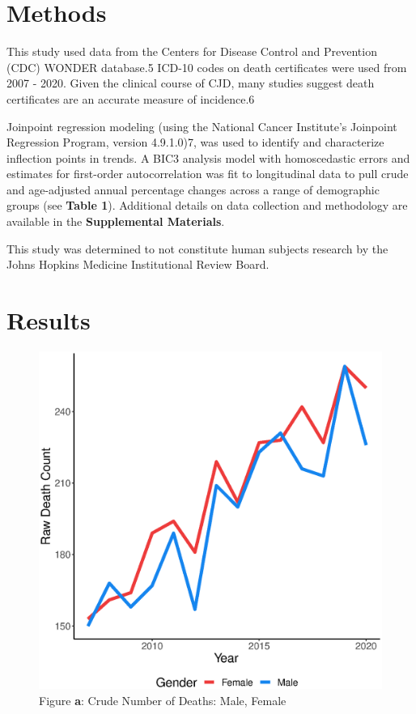 \documentclass[12pt]{article}
\begin{document}
\section*{Methods}

\par \bigskip
\noindent This study used data from the Centers for Disease Control and Prevention (CDC) WONDER database.5 ICD-10 codes on death certificates were used from 2007 - 2020. Given the clinical course of CJD, many studies suggest death certificates are an accurate measure of incidence.6

\par \bigskip
\noindent Joinpoint regression modeling (using the National Cancer Institute’s Joinpoint Regression Program, version 4.9.1.0)7, was used to identify and characterize inflection points in trends. A BIC3 analysis model with homoscedastic errors and estimates for first-order autocorrelation was fit to longitudinal data to pull crude and age-adjusted annual percentage changes across a range of demographic groups (see \textbf{Table 1}). Additional details on data collection and methodology are available in the \textbf{Supplemental Materials}.

\par \bigskip
\noindent This study was determined to not constitute human subjects research by the Johns Hopkins Medicine Institutional Review Board.

\newpage

\section*{Results}

\begin{figure}
    \centering
    \includegraphics[scale=0.5]{analysis/output/raw_deaths_by_gender_plot.eps}
    \caption{Figure \textbf{a}: Crude Number of Deaths: Male, Female}
    \label{fig:crude_deaths_by_gender}
\end{figure}
\end{document}
